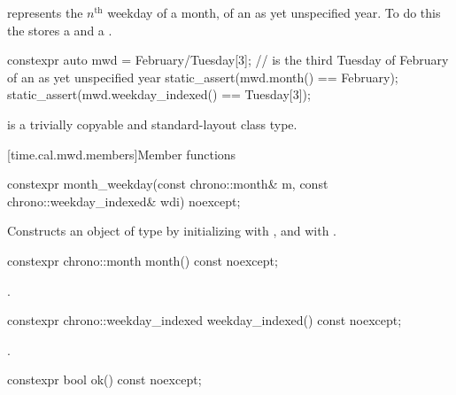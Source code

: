 \pnum
{} represents the $n^\text{th}$ weekday of a month,
of an as yet unspecified year.
To do this the  stores a  and a .

\pnum
\begin{example}
\begin{codeblock}
constexpr auto mwd
    = February/Tuesday[3];              //  is the third Tuesday of February of an as yet unspecified year
static_assert(mwd.month() == February);
static_assert(mwd.weekday_indexed() == Tuesday[3]);
\end{codeblock}
\end{example}

\pnum
{} is a trivially copyable and standard-layout class type.

[time.cal.mwd.members]{Member functions}

%
\begin{itemdecl}
constexpr month_weekday(const chrono::month& m, const chrono::weekday_indexed& wdi) noexcept;
\end{itemdecl}

\begin{itemdescr}
\pnum
\effects
Constructs an object of type  by
initializing  with , and  with .
\end{itemdescr}

%
\begin{itemdecl}
constexpr chrono::month month() const noexcept;
\end{itemdecl}

\begin{itemdescr}
\pnum
\returns
{}.
\end{itemdescr}

%
\begin{itemdecl}
constexpr chrono::weekday_indexed weekday_indexed() const noexcept;
\end{itemdecl}

\begin{itemdescr}
\pnum
\returns
{}.
\end{itemdescr}

%
\begin{itemdecl}
constexpr bool ok() const noexcept;
\end{itemdecl}

